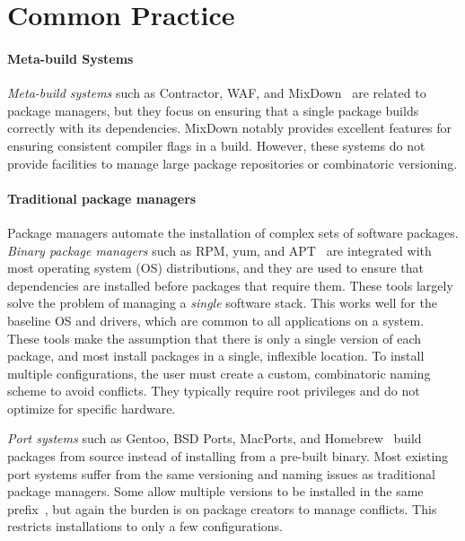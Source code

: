 
\section{Common Practice}
\label{sec:motivation}

\paragraph{Meta-build Systems}
{\it Meta-build systems} such as Contractor, WAF, and
MixDown~\cite{amundson:contractor,epperly+:mixdown,epperly+:mixdown-report,nagy:waf} are
related to package managers, but they focus on ensuring that a single
package builds correctly with its dependencies.  MixDown notably provides excellent
features for ensuring consistent compiler flags in a build.
However, these systems do not provide facilities to manage
large package repositories or combinatoric versioning.

\paragraph{Traditional package managers}
Package managers automate the installation of complex sets of software packages.
{\it Binary package managers} such as RPM, yum, and  
APT~\cite{foster+:rpm03,silva:apt01,yum} are integrated with most
operating system (OS) distributions, and they are used to ensure that dependencies
are installed before packages that require them.
These tools largely solve the problem of managing a {\it single} software
stack.  This works well for the baseline OS and drivers, which are 
common to all applications on a system.
These tools make the assumption that there is only a single version
of each package, and most install packages in a single, inflexible location.
To install multiple configurations, the user must create a custom, combinatoric
naming scheme to avoid conflicts. They typically require root 
privileges and do not optimize for specific hardware.

{\it Port systems} such as Gentoo, BSD Ports, MacPorts, and 
Homebrew~\cite{bsdports,groffen:gentoo-prefix,homebrew,macports,thiruvathukal:gentoo04}
build packages from source instead of installing from a pre-built binary.
Most existing port systems suffer from 
the same versioning and naming issues as traditional package managers.
Some allow multiple versions to be installed in the same
prefix~\cite{groffen:gentoo-prefix}, but again the burden is on package
creators to manage conflicts. This restricts installations to only a few
configurations.



